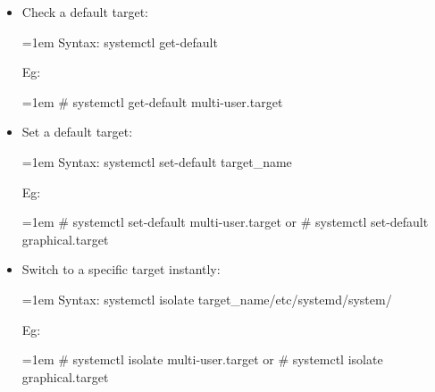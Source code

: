 \setlength{\columnsep}{3pt}
\begin{flushleft}
\bigskip

\begin{itemize}
	\item Check a default target:

	\begin{tcolorbox}[breakable,notitle,boxrule=0pt,colback=pink,colframe=pink]
		\color{black}
		\font=1em
		Syntax: systemctl get-default
		\font=4pt
	\end{tcolorbox}

	Eg:
	\begin{tcolorbox}[breakable,notitle,boxrule=-0pt,colback=black,colframe=black]
		\color{green}
		\font=1em
		\# systemctl get-default
		\newline
		\color{white}
		multi-user.target
		\font=4pt
	\end{tcolorbox}

\bigskip
\bigskip

	\item Set a default target:
	\begin{tcolorbox}[breakable,notitle,boxrule=0pt,colback=pink,colframe=pink]
		\color{black}
		\font=1em
		Syntax: systemctl set-default target\_name
		\font=4pt
	\end{tcolorbox}
	
	Eg:
	\begin{tcolorbox}[breakable,notitle,boxrule=-0pt,colback=black,colframe=black]
		\color{green}
		\font=1em
		\# systemctl set-default multi-user.target
		\newline
		or
		\newline
		\# systemctl set-default graphical.target
		\font=4pt
	\end{tcolorbox}


\bigskip
\bigskip

\item Switch to a specific target instantly:
\begin{tcolorbox}[breakable,notitle,boxrule=0pt,colback=pink,colframe=pink]
	\color{black}
	\font=1em
	Syntax: systemctl isolate target\_name/etc/systemd/system/
	\font=4pt
\end{tcolorbox}

Eg:
\begin{tcolorbox}[breakable,notitle,boxrule=-0pt,colback=black,colframe=black]
	\color{green}
	\font=1em
	\# systemctl isolate multi-user.target
	\newline
	or
	\newline
	\# systemctl isolate graphical.target
	\font=4pt
\end{tcolorbox}


\end{itemize}
	
\end{flushleft}
\newpage



